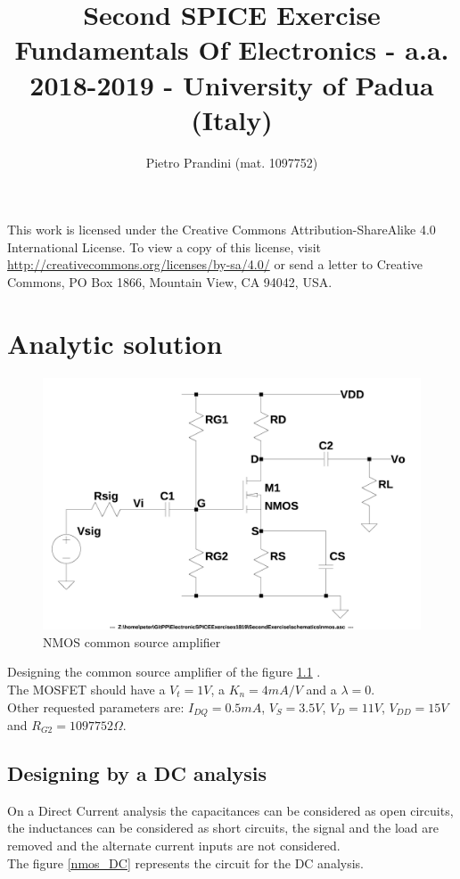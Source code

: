 \documentclass[10pt,a4paper]{book}
\title{Second SPICE Exercise\\{\small{Fundamentals Of Electronics - a.a. 2018-2019 -
University of Padua (Italy)}}}
\author{Pietro Prandini (mat. 1097752)}
\begin{document}
\maketitle

\vspace*{\fill}
\begin{center}
\tiny{This work is licensed under the Creative Commons Attribution-ShareAlike 4.0 International License. To view a copy of this license, visit \href{http://creativecommons.org/licenses/by-sa/4.0/}{http://creativecommons.org/licenses/by-sa/4.0/} or send a letter to Creative Commons, PO Box 1866, Mountain View, CA 94042, USA.}
\end{center}

\tableofcontents

\chapter{Analytic solution}

\begin{figure}[h]
  \centering
  \includegraphics[width=12cm]{schematics/nmos.jpg}
  \caption{NMOS common source amplifier}
  \label{nmos}
\end{figure}

Designing the common source amplifier of the figure \ref{nmos} .\\
The MOSFET should have a $V_t = 1V$, a $K_n = 4mA/V$ and a $\lambda = 0$.\\
Other requested parameters are: $I_{DQ} = 0.5mA$, $V_S = 3.5V$, $V_D = 11V$, $V_{DD} = 15V$ and $R_{G2} = 1097752\Omega$.\par

\section{Designing by a DC analysis}
On a Direct Current analysis the capacitances can be considered as open circuits, the inductances can be considered as short circuits, the signal and the load are removed and the alternate current inputs are not considered.\\
The figure \ref{nmos_DC} represents the circuit for the DC analysis.\par
\end{document}
